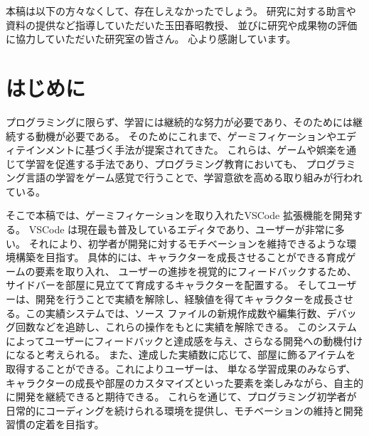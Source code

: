 \documentclass[12pt,twoside]{jbook}
\begin{document}
\begin{acknowledgments}
本稿は以下の方々なくして、存在しえなかったでしょう。
研究に対する助言や資料の提供など指導していただいた玉田春昭教授、
並びに研究や成果物の評価に協力していただいた研究室の皆さん。
心より感謝しています。

\end{acknowledgments}


\tableofcontents       %

%
%

\listoffigures         %
\listoftables          %


%
%
\chapter{はじめに}

 プログラミングに限らず、学習には継続的な努力が必要であり、そのためには継続する動機が必要である。
そのためにこれまで、ゲーミフィケーション\cite{2022caeai_zhan}やエディテインメント\cite{2020ipsj_hanayama}に基づく手法が提案されてきた。
これらは、ゲームや娯楽を通じて学習を促進する手法であり、プログラミング教育においても、
プログラミング言語の学習をゲーム感覚で行うことで、学習意欲を高める取り組みが行われている\cite{2014hicss_hamari}。

 そこで本稿では、ゲーミフィケーションを取り入れたVSCode 拡張機能を開発する。
VSCode は現在最も普及しているエディタであり、ユーザーが非常に多い。
それにより、初学者が開発に対するモチベーションを維持できるような環境構築を目指す。
具体的には、キャラクターを成長させることができる育成ゲームの要素を取り入れ、
ユーザーの進捗を視覚的にフィードバックするため、サイドバーを部屋に見立てて育成するキャラクターを配置する。
そしてユーザーは、開発を行うことで実績を解除し、経験値を得てキャラクターを成長させる。この実績システムでは、ソース
ファイルの新規作成数や編集行数、デバッグ回数などを追跡し、これらの操作をもとに実績を解除できる。
このシステムによってユーザーにフィードバックと達成感を与え、さらなる開発への動機付けになると考えられる。
また、達成した実績数に応じて、部屋に飾るアイテムを取得することができる。これによりユーザーは、
単なる学習成果のみならず、キャラクターの成長や部屋のカスタマイズといった要素を楽しみながら、自主的に開発を継続できると期待できる。
これらを通じて、プログラミング初学者が日常的にコーディングを続けられる環境を提供し、モチベーションの維持と開発習慣の定着を目指す。
\end{document}
